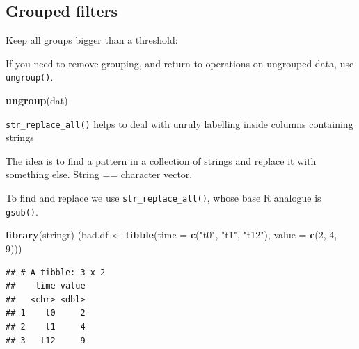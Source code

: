 \documentclass[]{book}
\newenvironment{Shaded}{\begin{snugshade}}{\end{snugshade}}
\newcommand{\KeywordTok}[1]{\textcolor[rgb]{0.13,0.29,0.53}{\textbf{#1}}}
\newcommand{\DataTypeTok}[1]{\textcolor[rgb]{0.13,0.29,0.53}{#1}}
\newcommand{\DecValTok}[1]{\textcolor[rgb]{0.00,0.00,0.81}{#1}}
\newcommand{\StringTok}[1]{\textcolor[rgb]{0.31,0.60,0.02}{#1}}
\newcommand{\OperatorTok}[1]{\textcolor[rgb]{0.81,0.36,0.00}{\textbf{#1}}}
\newcommand{\NormalTok}[1]{#1}
\begin{document}
\subsection{Grouped filters}\label{grouped-filters}

Keep all groups bigger than a threshold:

\begin{Shaded}
\end{Shaded}

If you need to remove grouping, and return to operations on ungrouped
data, use \texttt{ungroup()}.

\begin{Shaded}
\begin{Highlighting}[]
\KeywordTok{ungroup}\NormalTok{(dat) }
\end{Highlighting}
\end{Shaded}

\texttt{str\_replace\_all()} helps to deal with unruly labelling inside
columns containing strings

The idea is to find a pattern in a collection of strings and replace it
with something else. String == character vector.

To find and replace we use \texttt{str\_replace\_all()}, whose base R
analogue is \texttt{gsub()}.

\begin{Shaded}
\begin{Highlighting}[]
\KeywordTok{library}\NormalTok{(stringr)}
\NormalTok{(bad.df <-}\StringTok{ }\KeywordTok{tibble}\NormalTok{(}\DataTypeTok{time =} \KeywordTok{c}\NormalTok{(}\StringTok{"t0"}\NormalTok{, }\StringTok{"t1"}\NormalTok{, }\StringTok{"t12"}\NormalTok{), }\DataTypeTok{value =} \KeywordTok{c}\NormalTok{(}\DecValTok{2}\NormalTok{, }\DecValTok{4}\NormalTok{, }\DecValTok{9}\NormalTok{)))}
\end{Highlighting}
\end{Shaded}

\begin{verbatim}
## # A tibble: 3 x 2
##    time value
##   <chr> <dbl>
## 1    t0     2
## 2    t1     4
## 3   t12     9
\end{verbatim}
\end{document}
